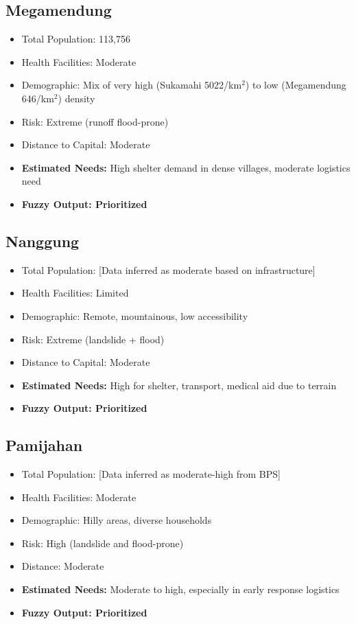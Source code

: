 \documentclass[journal,final,a4paper,twoside,11pt]{IEEEtran}
\begin{document}
\subsection{Megamendung}
\begin{itemize}
    \item Total Population: 113,756
    \item Health Facilities: Moderate
    \item Demographic: Mix of very high (Sukamahi 5022/km$^2$) to low (Megamendung 646/km$^2$) density
    \item Risk: Extreme (runoff flood-prone)
    \item Distance to Capital: Moderate
    \item \textbf{Estimated Needs:} High shelter demand in dense villages, moderate logistics need
    \item \textbf{Fuzzy Output: Prioritized}
\end{itemize}

\subsection{Nanggung}
\begin{itemize}
    \item Total Population: [Data inferred as moderate based on infrastructure]
    \item Health Facilities: Limited
    \item Demographic: Remote, mountainous, low accessibility
    \item Risk: Extreme (landslide + flood)
    \item Distance to Capital: Moderate
    \item \textbf{Estimated Needs:} High for shelter, transport, medical aid due to terrain
    \item \textbf{Fuzzy Output: Prioritized}
\end{itemize}

\subsection{Pamijahan}
\begin{itemize}
    \item Total Population: [Data inferred as moderate-high from BPS]
    \item Health Facilities: Moderate
    \item Demographic: Hilly areas, diverse households
    \item Risk: High (landslide and flood-prone)
    \item Distance: Moderate
    \item \textbf{Estimated Needs:} Moderate to high, especially in early response logistics
    \item \textbf{Fuzzy Output: Prioritized}
\end{itemize}
\end{document}
